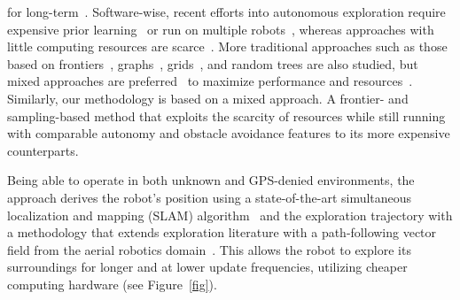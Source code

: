 \documentclass[letterpaper,10pt,conference,twoside]{IEEEtran}
\theoremstyle{definition}
\begin{document}
for long-term~\cite{eldemiry2022autonomous,bircher2016receding}.
%
Software-wise, %
recent efforts into autonomous exploration require expensive prior learning~\cite{shrestha2019learned} or run on multiple robots~\cite{kulkarni2022autonomous,tranzatto2022cerberus,roucek2020darpa}, whereas %
approaches with little computing resources are scarce~\cite{bircher2016receding,batinovic2021multi,faisal2021low,muller2021openbot}. More traditional approaches such as those based on frontiers~\cite{kim2022autonomous,roucek2020darpa,batinovic2021multi}, graphs~\cite{kulkarni2022autonomous,tranzatto2022cerberus,dang2019graph}, grids~\cite{corah2019communication,tabib2022autonomous}, and random trees %
are also studied, but mixed approaches are %
preferred~\cite{%
shrestha2019learned,bircher2016receding,surmann2003autonomous,qiao2019sampling,
dai2020fast} to maximize performance and resources~\cite{placed2022survey,bircher2016receding}.
%
Similarly, our methodology is based on a mixed approach. A frontier- and sampling-based method that exploits the scarcity of resources while still running %
with comparable autonomy and obstacle avoidance features to its more expensive counterparts. %

Being able to operate in both unknown and GPS-denied environments, the %
approach derives the robot's 
position using a state-of-the-art simultaneous localization and mapping (SLAM) algorithm~\cite{labbe2019rtab} %
and the exploration trajectory with a %
methodology that extends exploration literature with a path-following vector field %
from the aerial robotics domain~\cite{seewald2022energy,garcia2017guidance,seewaldphdthesis}. This allows the robot to explore its surroundings for longer and at lower update frequencies, %
utilizing cheaper computing hardware %
(see Figure~\ref{fig}).%
\end{document}
